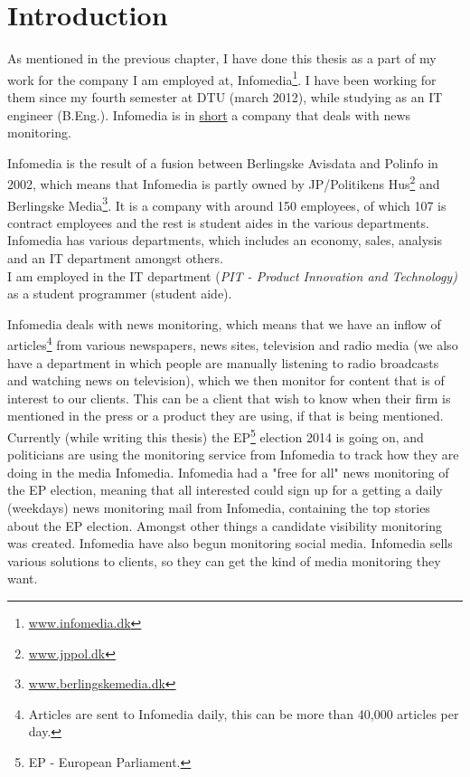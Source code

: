 \chapter{Introduction}
As mentioned in the previous chapter, I have done this thesis as a part of my work for the company I am employed at, Infomedia\footnote{\url{www.infomedia.dk}}. I have been working for them since my fourth semester at DTU (march 2012), while studying as an IT engineer (B.Eng.). Infomedia is in \underline{short} a company that deals with news monitoring.

Infomedia is the result of a fusion between Berlingske Avisdata and Polinfo in 2002, which means that Infomedia is partly owned by JP/Politikens Hus\footnote{\url{www.jppol.dk}} and Berlingske Media\footnote{\url{www.berlingskemedia.dk}}. It is a company with around 150 employees, of which 107 is contract employees and the rest is student aides in the various departments. Infomedia has various departments, which includes an economy, sales, analysis and an IT department amongst others.\\
I am employed in the IT department (\textit{PIT - Product Innovation and Technology)} as a student programmer (student aide).

Infomedia deals with news monitoring, which means that we have an inflow of articles\footnote{Articles are sent to Infomedia daily, this can be more than 40,000 articles per day.} from various newspapers, news sites, television and radio media (we also have a department in which people are manually listening to radio broadcasts and watching news on television), which we then monitor for content that is of interest to our clients.  This can be a client that wish to know when their firm is mentioned in the press or a product they are using, if that is being mentioned. 
Currently (while writing this thesis) the EP\footnote{EP - European Parliament.} election 2014 is going on, and politicians are using the monitoring service from Infomedia to track how they are doing in the media Infomedia\cite{EuropaValg}. Infomedia had a "free for all" news monitoring of the EP election, meaning that all interested could sign up for a getting a daily (weekdays) news monitoring mail from Infomedia, containing the top stories about the EP election. Amongst other things a candidate visibility monitoring was created\cite{InfomediaEpKandidater}. Infomedia have also begun monitoring social media. Infomedia sells various solutions to clients, so they can get the kind of media monitoring they want.

